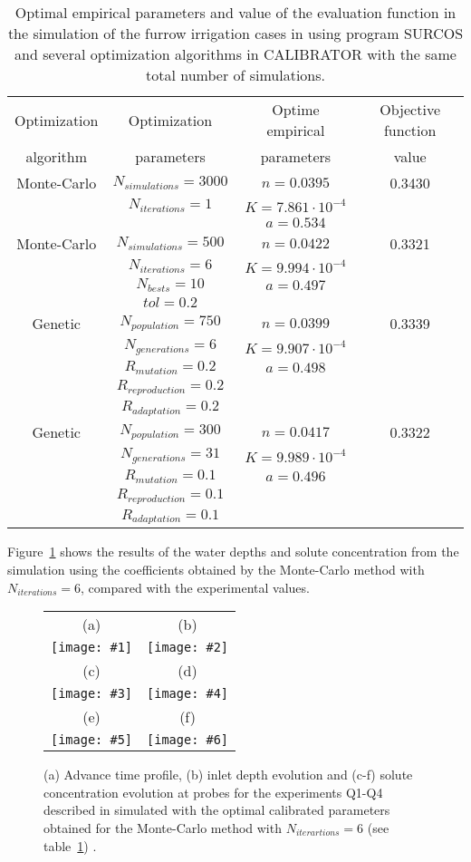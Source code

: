 \documentclass[review,authoryear]{elsarticle}
\newcommand{\TABLE}[5]
{
	\begin{table}[ht!]
		\centering
		\caption{#4.\label{#5}}
		#1
		\begin{tabular}{#2}
			#3
		\end{tabular}
	\end{table}
}
\newcommand{\FIGVI}[8]
{
	\begin{figure}[ht!]
		\centering
		\begin{tabular}{cc}
			(a) & (b)
			\\ \texttt{[image: \#1]} & \texttt{[image: \#2]}
			\\ (c) & (d)
			\\ \texttt{[image: \#3]} & \texttt{[image: \#4]}
			\\ (e) & (f)
			\\ \texttt{[image: \#5]} & \texttt{[image: \#6]}
		\end{tabular}
		\caption{#7.\label{#8}}
	\end{figure}
}
\begin{document}
\TABLE{\scriptsize}{cccc}
{
	Optimization & Optimization & Optime empirical & Objective function
	\\ algorithm & parameters & parameters & value
	\\ \hline
	Monte-Carlo & $N_{simulations}=3000$ & $n=0.0395$ & 0.3430
	\\ & $N_{iterations}=1$ & $K=7.861\cdot 10^{-4}$
	\\ & & $a=0.534$
	\\ \hline
	Monte-Carlo & $N_{simulations}=500$ & $n=0.0422$ & 0.3321
	\\ & $N_{iterations}=6$ & $K=9.994\cdot 10^{-4}$
	\\ & $N_{bests}=10$ & $a=0.497$
	\\ & $tol=0.2$
	\\ \hline
	Genetic & $N_{population}=750$ & $n=0.0399$ & 0.3339
	\\ & $N_{generations}=6$ & $K=9.907\cdot 10^{-4}$
	\\ & $R_{mutation}=0.2$ & $a=0.498$
	\\ & $R_{reproduction}=0.2$
	\\ & $R_{adaptation}=0.2$
	\\ \hline
	Genetic & $N_{population}=300$ & $n=0.0417$ & 0.3322
	\\ & $N_{generations}=31$ & $K=9.989\cdot 10^{-4}$
	\\ & $R_{mutation}=0.1$ & $a=0.496$
	\\ & $R_{reproduction}=0.1$
	\\ & $R_{adaptation}=0.1$
	\\ \hline
}{Optimal empirical parameters and value of the evaluation function in the simulation of the furrow irrigation cases in \citet{JaviSurcos2} using program SURCOS and several optimization algorithms in CALIBRATOR with the same total number of simulations}{TabSurcos}

Figure~\ref{FigSurcos} shows the results of the water depths and solute concentration from the simulation using the coefficients obtained by the Monte-Carlo method with$N_{iterations}=6$, compared with the experimental values.

\FIGVI{surcos-advance.eps}{surcos-depth.eps}{surcos-solute-q1.eps}
{surcos-solute-q2.eps}{surcos-solute-q3.eps}{surcos-solute-q4.eps}
{
	(a) Advance time profile, (b) inlet depth evolution and (c-f) solute
	concentration evolution at probes for the experiments Q1-Q4 described in
	\citet{JaviSurcos2} simulated with the optimal calibrated parameters obtained
	for the Monte-Carlo method with $N_{iterartions}=6$ (see
	table~\ref{TabSurcos})
}{FigSurcos}
\end{document}
